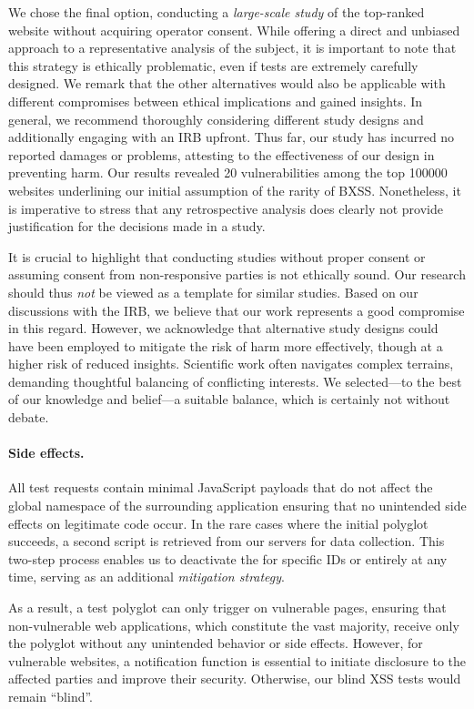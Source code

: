 We chose the final option, conducting a \emph{large-scale study} of the top-ranked website without acquiring operator consent.
While offering a direct and unbiased approach to a representative analysis of the subject, it is important to note that this strategy is ethically problematic, even if tests are extremely carefully designed. 
We remark that the other alternatives would also be applicable with different compromises between ethical implications and gained insights.
In general, we recommend thoroughly considering different study designs and additionally engaging with an IRB upfront. 
Thus far, our study has incurred no reported damages or problems, attesting to the effectiveness of our design in preventing harm.
Our results revealed \num{20} vulnerabilities among the top \num{100000} websites underlining our initial assumption of the rarity of BXSS\@.
Nonetheless, it is imperative to stress that any retrospective analysis does clearly not provide justification for the decisions made in a study.


It is crucial to highlight that conducting studies without proper consent or assuming consent from non-responsive parties is not ethically sound. Our research should thus \emph{not} be viewed as a template for similar studies. Based on our discussions with the IRB, we believe that our work represents a good compromise in this regard. However, we acknowledge that alternative study designs could have been employed to mitigate the risk of harm more effectively, though at a higher risk of reduced insights. Scientific work often navigates complex terrains, demanding thoughtful balancing of conflicting interests. We selected---to the best of our knowledge and belief---a suitable balance, which is certainly not without debate.

\vspace{-1em}\paragraph{Side effects.}
All test requests contain minimal JavaScript payloads that do not affect the global namespace of the surrounding application ensuring that no unintended side effects on legitimate code occur.
In the rare cases where the initial polyglot succeeds, a second script is retrieved from our servers for data collection.
This two-step process enables us to deactivate the \ourscriptname{} for specific IDs or entirely at any time, serving as an additional \textit{mitigation strategy}. %

As a result, a test polyglot can only trigger on vulnerable pages, ensuring that non-vulnerable web applications, which constitute the vast majority, receive only the polyglot without any unintended behavior or side effects.
However, for vulnerable websites, a notification function is essential to initiate disclosure to the affected parties and improve their security.
Otherwise, our blind XSS tests would remain ``blind''.

